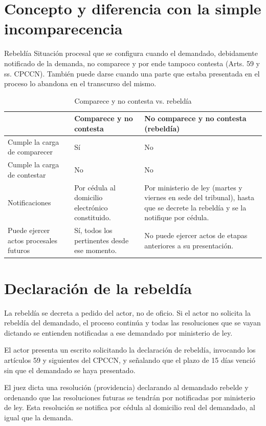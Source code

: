 \documentclass[12pt,oneside]{book}
\begin{document}
\section{Concepto y diferencia con la simple incomparecencia}

\begin{definition}{Rebeldía}
Situación procesal que se configura cuando el demandado, debidamente notificado de la demanda, no comparece y por ende tampoco contesta (Arts. 59 y ss. CPCCN). También puede darse cuando una parte que estaba presentada en el proceso lo abandona en el transcurso del mismo.
\end{definition}

\begin{table}[H]
\centering
\caption{Comparece y no contesta vs. rebeldía}
\begin{tabularx}{\textwidth}{p{} X X}
\toprule
 & \textbf{Comparece y no contesta} & \textbf{No comparece y no contesta (rebeldía)} \\
\midrule
Cumple la carga de comparecer & Sí & No \\
Cumple la carga de contestar & No & No \\
Notificaciones & Por cédula al domicilio electrónico constituido. & Por ministerio de ley (martes y viernes en sede del tribunal), hasta que se decrete la rebeldía y se la notifique por cédula. \\
Puede ejercer actos procesales futuros & Sí, todos los pertinentes desde ese momento. & No puede ejercer actos de etapas anteriores a su presentación. \\
\bottomrule
\end{tabularx}
\end{table}

\section{Declaración de la rebeldía}

La rebeldía se decreta a pedido del actor, no de oficio. Si el actor no solicita la rebeldía del demandado, el proceso continúa y todas las resoluciones que se vayan dictando se entienden notificadas a ese demandado por ministerio de ley.

El actor presenta un escrito solicitando la declaración de rebeldía, invocando los artículos 59 y siguientes del CPCCN, y señalando que el plazo de 15 días venció sin que el demandado se haya presentado.

El juez dicta una resolución (providencia) declarando al demandado rebelde y ordenando que las resoluciones futuras se tendrán por notificadas por ministerio de ley. Esta resolución se notifica por cédula al domicilio real del demandado, al igual que la demanda.
\end{document}
